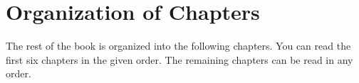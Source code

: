 





\section{Organization of Chapters}

The rest of the book is organized into the following chapters. You can read the
first six chapters in the given order. The remaining chapters can be read in any
order.

